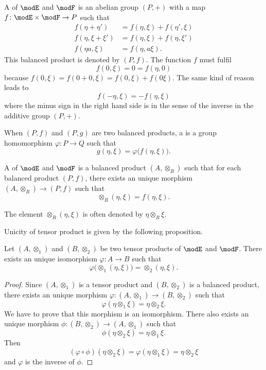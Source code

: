 A  of $\modE$ and $\modF$ is an abelian group $(P,+)$ with a map $f\colon \modE\times\modF\to P$ such that
\begin{subequations}
	\begin{align}
		f(\eta+\eta')    & =f(\eta,\xi)+f(\eta',\xi) \\
		f(\eta,\xi+\xi') & =f(\eta,\xi)+f(\eta,\xi') \\
		f(\eta a,\xi)    & =f(\eta,a\xi).
	\end{align}
\end{subequations}
This balanced product is denoted by $(P,f)$. The function $f$ must fulfil
\[
	f(0,\xi)=0=f(\eta,0)
\]
because $f(0,\xi)=f(0+0,\xi)=f(0,\xi)+f(0\xi)$. The same kind of reason leads to
\[
	f(-\eta,\xi)=-f(\eta,\xi)
\]
where the minus sign in the right hand side is in the sense of the inverse in the additive group $(P,+)$.

When $(P,f)$ and $(P,g)$ are two balanced products, a  is a group homomorphism $\varphi\colon P\to Q$ such that
\[
	g(\eta,\xi)=\varphi\big( f(\eta,\xi) \big).
\]

\begin{definition}
	A  of $\modE$ and $\modF$ is a balanced product $(A,\otimes_R)$ such that for each balanced product $(P,f)$, there exists an unique morphism $(A,\otimes_R)\to(P,f)$ such that
	\[
		\otimes_R(\eta,\xi)=f(\eta,\xi).
	\]

\end{definition}
The element $\otimes_R(\eta,\xi)$ is often denoted by $\eta\otimes_R\xi$.

Unicity of tensor product is given by the following proposition.

\begin{proposition}
	Let $(A,\otimes_1)$ and $(B,\otimes_2)$ be two tensor products of $\modE$ and $\modF$. There exists an unique isomorphism $\varphi\colon A\to B$ such that
	\[
		\varphi\big( \otimes_1(\eta,\xi) \big)=\otimes_2(\eta,\xi).
	\]

\end{proposition}

\begin{proof}
	Since $(A,\otimes_1)$ is a tensor product and $(B,\otimes_2)$ is a balanced product, there exists an unique morphism $\varphi\colon (A,\otimes_1)\to (B,\otimes_2)$ such that
	\[
		\varphi(\eta\otimes_1\xi)=\eta\otimes_2\xi.
	\]
	We have to prove that this morphism is an isomorphism. There also exists an unique morphism $\phi\colon (B,\otimes_2)\to (A,\otimes_1)$ such that
	\[
		\phi(\eta\otimes_2\xi)=\eta\otimes_1\xi.
	\]
	Then
	\[
		(\varphi\circ\phi)(\eta\otimes_2\xi)=\varphi(\eta\otimes_1\xi)=\eta\otimes_2\xi
	\]
	and $\varphi$ is the inverse of $\phi$.
\end{proof}

